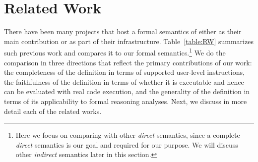 \section{Related Work}\label{sec:RW}

% 
% 

There have been many projects that host a formal semantics of \ISA either as
their main contribution or as part of their infrastructure.
Table~\ref{table:RW} summarizes such previous work and compares it to our formal semantics.\footnote{Here we focus on comparing with other \emph{direct} semantics, since a complete \emph{direct} semantics is our goal and required for our purpose. We will discuss other \emph{indirect} semantics later in this section.}
We do the comparison in three directions that reflect the
primary contributions of our work: the completeness of the definition in terms
of supported user-level instructions, the faithfulness of the definition in
terms of whether it is executable and hence can be evaluated with real code
execution, and the generality of the definition in terms of its applicability to
formal reasoning analyses. Next, we discuss in more detail each of the
related works.


